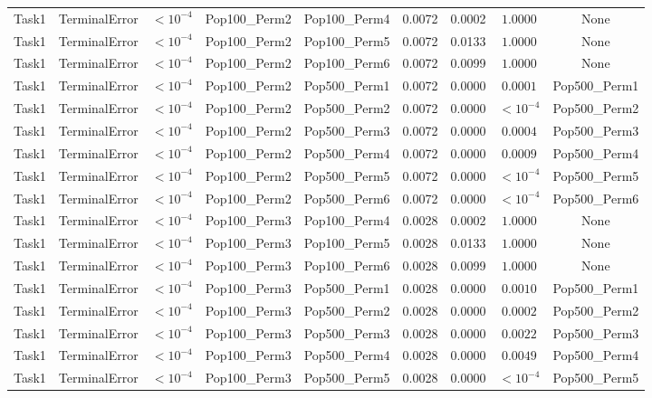 \documentclass[8pt]{article}
\begin{document}
\begin{longtable}{llccccccc}
Task1 & TerminalError & $< 10^{-4}$ & Pop100\_Perm2 & Pop100\_Perm4 & 0.0072 & 0.0002 & $1.0000$ & None \\
Task1 & TerminalError & $< 10^{-4}$ & Pop100\_Perm2 & Pop100\_Perm5 & 0.0072 & 0.0133 & $1.0000$ & None \\
Task1 & TerminalError & $< 10^{-4}$ & Pop100\_Perm2 & Pop100\_Perm6 & 0.0072 & 0.0099 & $1.0000$ & None \\
Task1 & TerminalError & $< 10^{-4}$ & Pop100\_Perm2 & Pop500\_Perm1 & 0.0072 & 0.0000 & $0.0001$ & Pop500\_Perm1 \\
Task1 & TerminalError & $< 10^{-4}$ & Pop100\_Perm2 & Pop500\_Perm2 & 0.0072 & 0.0000 & $< 10^{-4}$ & Pop500\_Perm2 \\
Task1 & TerminalError & $< 10^{-4}$ & Pop100\_Perm2 & Pop500\_Perm3 & 0.0072 & 0.0000 & $0.0004$ & Pop500\_Perm3 \\
Task1 & TerminalError & $< 10^{-4}$ & Pop100\_Perm2 & Pop500\_Perm4 & 0.0072 & 0.0000 & $0.0009$ & Pop500\_Perm4 \\
Task1 & TerminalError & $< 10^{-4}$ & Pop100\_Perm2 & Pop500\_Perm5 & 0.0072 & 0.0000 & $< 10^{-4}$ & Pop500\_Perm5 \\
Task1 & TerminalError & $< 10^{-4}$ & Pop100\_Perm2 & Pop500\_Perm6 & 0.0072 & 0.0000 & $< 10^{-4}$ & Pop500\_Perm6 \\
Task1 & TerminalError & $< 10^{-4}$ & Pop100\_Perm3 & Pop100\_Perm4 & 0.0028 & 0.0002 & $1.0000$ & None \\
Task1 & TerminalError & $< 10^{-4}$ & Pop100\_Perm3 & Pop100\_Perm5 & 0.0028 & 0.0133 & $1.0000$ & None \\
Task1 & TerminalError & $< 10^{-4}$ & Pop100\_Perm3 & Pop100\_Perm6 & 0.0028 & 0.0099 & $1.0000$ & None \\
Task1 & TerminalError & $< 10^{-4}$ & Pop100\_Perm3 & Pop500\_Perm1 & 0.0028 & 0.0000 & $0.0010$ & Pop500\_Perm1 \\
Task1 & TerminalError & $< 10^{-4}$ & Pop100\_Perm3 & Pop500\_Perm2 & 0.0028 & 0.0000 & $0.0002$ & Pop500\_Perm2 \\
Task1 & TerminalError & $< 10^{-4}$ & Pop100\_Perm3 & Pop500\_Perm3 & 0.0028 & 0.0000 & $0.0022$ & Pop500\_Perm3 \\
Task1 & TerminalError & $< 10^{-4}$ & Pop100\_Perm3 & Pop500\_Perm4 & 0.0028 & 0.0000 & $0.0049$ & Pop500\_Perm4 \\
Task1 & TerminalError & $< 10^{-4}$ & Pop100\_Perm3 & Pop500\_Perm5 & 0.0028 & 0.0000 & $< 10^{-4}$ & Pop500\_Perm5 \\

\end{longtable}
\end{document}
